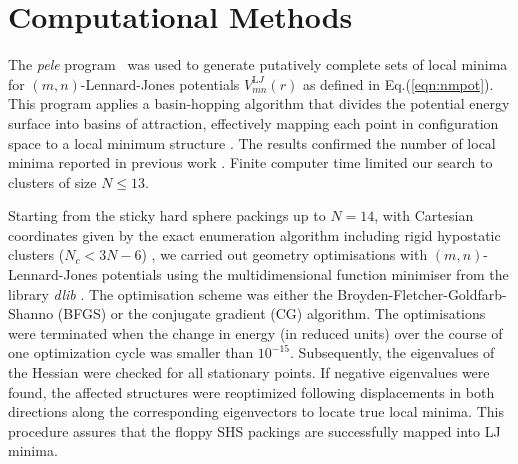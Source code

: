 \section{Computational Methods}

The \textit{pele} program~\autocite{_pelePythonenergy_2017} was used to generate putatively
complete sets of local minima for $(m,n)$-Lennard-Jones potentials 
$V_{mn}^{\mathrm LJ}(r)$ as defined in Eq.(\ref{eqn:nmpot}).
This program  applies a basin-hopping algorithm that divides the potential energy
surface into basins of attraction, effectively mapping each point in
configuration space to a local minimum structure
\autocite{lis87,waless99,Wales_GlobalOptimizationBasinHopping_1997}.  The results confirmed the
number of local minima reported in previous work \autocite{Doye_Saddlepointsdynamics_2002}.
Finite computer time limited our search to clusters of size $N \leq 13$.

Starting from the sticky hard sphere packings up to $N=14$, with Cartesian
coordinates given by the exact enumeration algorithm \autocite{Hoy_Structurefinitesphere_2012}
including rigid hypostatic clusters ($N_c<3N-6$) \autocite{Holmes-Cerfon_EnumeratingRigidSphere_2016}, we carried out geometry
optimisations with $(m,n)$-Lennard-Jones potentials using the multidimensional function minimiser from the
\Cpp library \textit{dlib} \autocite{King_DlibmlMachineLearning_2009}. The optimisation scheme
was either the Broyden-Fletcher-Goldfarb-Shanno (BFGS) or the conjugate
gradient (CG) algorithm.  The optimisations were terminated when the change in
energy (in reduced units) over the course of one optimization cycle was smaller
than $10^{-15}$. 
Subsequently, the eigenvalues of the Hessian were checked
for all stationary points. If negative eigenvalues were found, the affected
structures were reoptimized following displacements in both directions along
the corresponding eigenvectors to locate true local minima. This procedure assures
that the floppy \ac{SHS} packings are successfully mapped into LJ minima.

